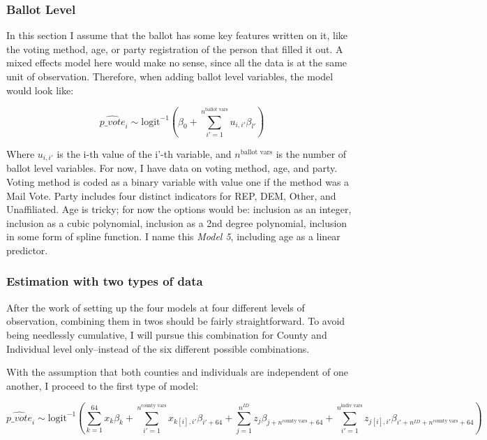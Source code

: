 \documentclass[12pt,twoside]{reedthesis}
\begin{document}
  \subsubsection{Ballot Level}\label{ballot-level}
  
  In this section I assume that the ballot has some key features written
  on it, like the voting method, age, or party registration of the person
  that filled it out. A mixed effects model here would make no sense,
  since all the data is at the same unit of observation. Therefore, when
  adding ballot level variables, the model would look like:
  
  \[\hat{p\_vote}_i \sim \text{logit}^{-1}(\beta_0 + \sum_{i' = 1}^{n^{\text{ballot vars}}}u_{i,i'}\beta_{l'})\]
  
  Where \(u_{i,i'}\) is the i-th value of the i'-th variable, and
  \(n^{\text{ballot vars}}\) is the number of ballot level variables. For
  now, I have data on voting method, age, and party. Voting method is
  coded as a binary variable with value one if the method was a Mail Vote.
  Party includes four distinct indicators for REP, DEM, Other, and
  Unaffiliated. Age is tricky; for now the options would be: inclusion as
  an integer, inclusion as a cubic polynomial, inclusion as a 2nd degree
  polynomial, inclusion in some form of spline function. I name this
  \emph{Model 5}, including age as a linear predictor.
  
  \subsubsection{Estimation with two types of
  data}\label{estimation-with-two-types-of-data}
  
  After the work of setting up the four models at four different levels of
  observation, combining them in twos should be fairly straightforward. To
  avoid being needlessly cumulative, I will pursue this combination for
  County and Individual level only--instead of the six different possible
  combinations.
  
  With the assumption that both counties and individuals are independent
  of one another, I proceed to the first type of model:
  
  \[\hat{p\_vote}_i \sim \text{logit}^{-1}(\sum_{k = 1}^{64}x_{k}\beta_{k} + \sum_{i'=1}^{n^{\text{county vars}}}x_{k[i], i'}\beta_{i'+64} + \sum_{j = 1}^{n^{ID}}z_{j}\beta_{j + n^{\text{county vars}} + 64} + \sum_{i'=1}^{n^{\text{indiv vars}}}z_{j[i], i'}\beta_{i'+n^{ID} + n^{\text{county vars}} + 64})\]
  
\end{document}
